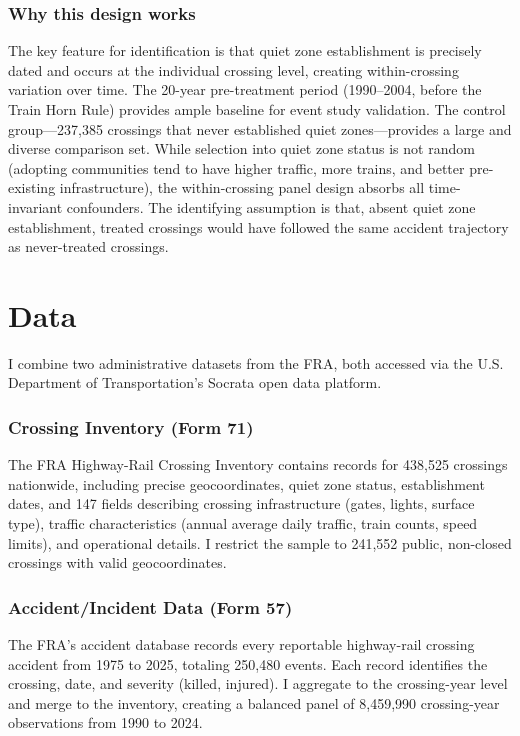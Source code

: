\documentclass[12pt]{article}
\begin{document}
\subsubsection*{Why this design works} The key feature for identification is that quiet zone establishment is precisely dated and occurs at the individual crossing level, creating within-crossing variation over time. The 20-year pre-treatment period (1990--2004, before the Train Horn Rule) provides ample baseline for event study validation. The control group---237,385 crossings that never established quiet zones---provides a large and diverse comparison set. While selection into quiet zone status is not random (adopting communities tend to have higher traffic, more trains, and better pre-existing infrastructure), the within-crossing panel design absorbs all time-invariant confounders. The identifying assumption is that, absent quiet zone establishment, treated crossings would have followed the same accident trajectory as never-treated crossings.


\section{Data}

I combine two administrative datasets from the FRA, both accessed via the U.S. Department of Transportation's Socrata open data platform.

\subsubsection*{Crossing Inventory (Form 71)} The FRA Highway-Rail Crossing Inventory contains records for 438,525 crossings nationwide, including precise geocoordinates, quiet zone status, establishment dates, and 147 fields describing crossing infrastructure (gates, lights, surface type), traffic characteristics (annual average daily traffic, train counts, speed limits), and operational details. I restrict the sample to 241,552 public, non-closed crossings with valid geocoordinates.

\subsubsection*{Accident/Incident Data (Form 57)} The FRA's accident database records every reportable highway-rail crossing accident from 1975 to 2025, totaling 250,480 events. Each record identifies the crossing, date, and severity (killed, injured). I aggregate to the crossing-year level and merge to the inventory, creating a balanced panel of 8,459,990 crossing-year observations from 1990 to 2024.
\end{document}
